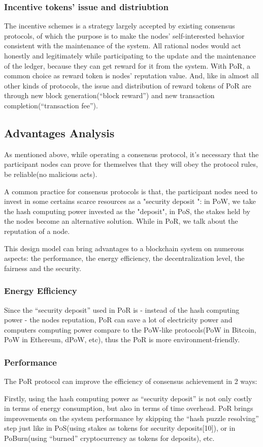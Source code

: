 \documentclass[doublespacing]{bmcart}
\begin{document}
\begin{CJK*}{UTF8}{gbsn}
\subsubsection*{Incentive tokens' issue and distriubtion}
The incentive schemes is a strategy largely accepted by existing consensus protocols, of which the purpose is to make the nodes' self-interested behavior consistent with the maintenance of the system. All rational nodes would act honestly and legitimately while participating to the update and the maintenance of the ledger, because they can get reward for it from the system.
 With PoR, a common choice as reward token is nodes' reputation value. And, like in almost all other kinds of protocols, the issue and distribution of reward tokens of PoR are through new block generation(``block reward'') and new transaction completion(``transaction fee'').

\subsection{Advantages Analysis}
 As mentioned above, while operating a consensus protocol, it's necessary that the participant nodes can prove for themselves that they will obey the protocol rules, be reliable(no malicious acts).

A common practice for consensus protocols is that, the participant nodes need to invest in some certains scarce resources as a "security deposit
": in PoW, we take the hash computing power invested as the "deposit", in PoS, the stakes held by the nodes become an alternative solution. While in PoR, we talk about the reputation of a node.

This design model can bring advantages to a blockchain system on numerous aspects: the performance, the energy efficiency, the decentralization level, the fairness and the security.
\subsubsection*{Energy Efficiency}
Since the ``security deposit'' used in PoR is - instead of the hash computing power - the nodes reputation, PoR can save a lot of electricity power and computers computing power compare to the PoW-like protocols(PoW in Bitcoin, PoW in Ethereum, dPoW, etc), thus the PoR is more environment-friendly.  
\subsubsection*{Performance}
The PoR protocol can improve the efficiency of consensus achievement in 2 ways:
\par Firstly, using the hash computing power as ``security deposit'' is not only costly in terms of energy consumption, but also in terms of time overhead. PoR brings improvements on the system performance by skipping the ``hash puzzle resolving'' step just like in PoS(using stakes as tokens for security deposits[10]), or in PoBurn(using ``burned'' cryptocurrency as tokens for deposits), etc.
 

\end{CJK*}
\end{document}
